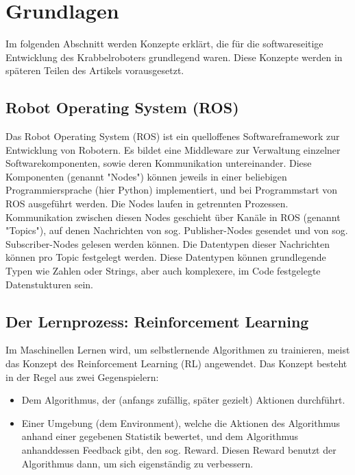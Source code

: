 \section{Grundlagen}
\label{sec:grundlagen}

Im folgenden Abschnitt werden Konzepte erklärt, die für die softwareseitige Entwicklung des Krabbelroboters grundlegend waren. Diese Konzepte werden in späteren Teilen des Artikels vorausgesetzt.

\subsection{Robot Operating System (ROS)}

Das Robot Operating System (ROS)\cite{ros} ist ein quelloffenes Softwareframework zur Entwicklung von Robotern. Es bildet eine Middleware zur Verwaltung einzelner Softwarekomponenten, sowie deren Kommunikation untereinander. Diese Komponenten (genannt "Nodes") können jeweils in einer beliebigen Programmiersprache (hier Python) implementiert, und bei Programmstart von ROS ausgeführt werden. Die Nodes laufen in getrennten Prozessen. Kommunikation zwischen diesen Nodes geschieht über Kanäle in ROS (genannt "Topics"), auf denen Nachrichten von sog. Publisher-Nodes gesendet und von sog. Subscriber-Nodes gelesen werden können. Die Datentypen dieser Nachrichten können pro Topic festgelegt werden. Diese Datentypen können grundlegende Typen wie Zahlen oder Strings, aber auch komplexere, im Code festgelegte Datenstukturen sein.

\subsection{Der Lernprozess: Reinforcement Learning}
\label{sec:reinforcement_learning}

Im Maschinellen Lernen wird, um selbstlernende Algorithmen zu trainieren, meist das Konzept des Reinforcement Learning (RL) angewendet. Das Konzept besteht in der Regel aus zwei Gegenspielern:
\begin{itemize}
    \item Dem Algorithmus, der (anfangs zufällig, später gezielt) Aktionen durchführt.
    \item Einer Umgebung (dem Environment), welche die Aktionen des Algorithmus anhand einer gegebenen Statistik bewertet, und dem Algorithmus anhanddessen Feedback gibt, den sog. Reward. Diesen Reward benutzt der Algorithmus dann, um sich eigenständig zu verbessern.
\end{itemize}

